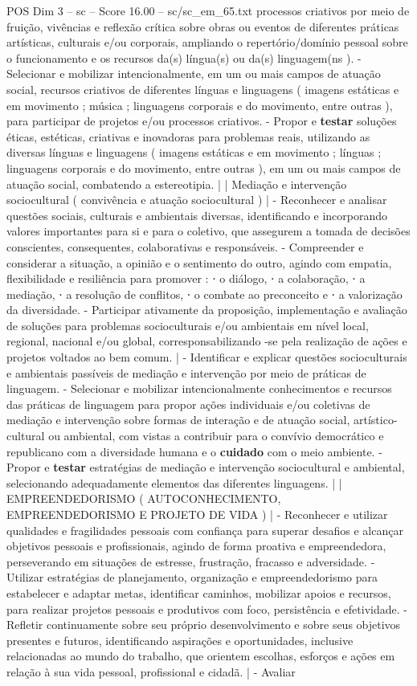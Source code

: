 \begin{textsample}{POS Dim 3 – sc – Score 16.00 – sc/sc\_em\_65.txt}
processos criativos por meio de fruição, vivências e reflexão crítica sobre obras ou eventos de diferentes práticas artísticas, culturais e/ou corporais, ampliando o repertório/domínio pessoal sobre o funcionamento e os recursos da(s) língua(s) ou da(s) linguagem(ns ). - Selecionar e mobilizar intencionalmente, em um ou mais campos de atuação social, recursos criativos de diferentes línguas e linguagens ( imagens estáticas e em movimento ; música ; linguagens corporais e do movimento, entre outras ), para participar de projetos e/ou processos criativos. - Propor e \textbf{testar} soluções éticas, estéticas, criativas e inovadoras para problemas reais, utilizando as diversas línguas e linguagens ( imagens estáticas e em movimento ; línguas ; linguagens corporais e do movimento, entre outras ), em um ou mais campos de atuação social, combatendo a estereotipia. | | Mediação e intervenção sociocultural ( convivência e atuação sociocultural ) | - Reconhecer e analisar questões sociais, culturais e ambientais diversas, identificando e incorporando valores importantes para si e para o coletivo, que assegurem a tomada de decisões conscientes, consequentes, colaborativas e responsáveis. - Compreender e considerar a situação, a opinião e o sentimento do outro, agindo com empatia, flexibilidade e resiliência para promover : ⋅ o diálogo, ⋅ a colaboração, ⋅ a mediação, ⋅ a resolução de conflitos, ⋅ o combate ao preconceito e ⋅ a valorização da diversidade. - Participar ativamente da proposição, implementação e avaliação de soluções para problemas socioculturais e/ou ambientais em nível local, regional, nacional e/ou global, corresponsabilizando -se pela realização de ações e projetos voltados ao bem comum. | - Identificar e explicar questões socioculturais e ambientais passíveis de mediação e intervenção por meio de práticas de linguagem. - Selecionar e mobilizar intencionalmente conhecimentos e recursos das práticas de linguagem para propor ações individuais e/ou coletivas de mediação e intervenção sobre formas de interação e de atuação social, artístico-cultural ou ambiental, com vistas a contribuir para o convívio democrático e republicano com a diversidade humana e o \textbf{cuidado} com o meio ambiente. - Propor e \textbf{testar} estratégias de mediação e intervenção sociocultural e ambiental, selecionando adequadamente elementos das diferentes linguagens. | | EMPREENDEDORISMO ( AUTOCONHECIMENTO, EMPREENDEDORISMO E PROJETO DE VIDA ) | - Reconhecer e utilizar qualidades e fragilidades pessoais com confiança para superar desafios e alcançar objetivos pessoais e profissionais, agindo de forma proativa e empreendedora, perseverando em situações de estresse, frustração, fracasso e adversidade. - Utilizar estratégias de planejamento, organização e empreendedorismo para estabelecer e adaptar metas, identificar caminhos, mobilizar apoios e recursos, para realizar projetos pessoais e produtivos com foco, persistência e efetividade. - Refletir continuamente sobre seu próprio desenvolvimento e sobre seus objetivos presentes e futuros, identificando aspirações e oportunidades, inclusive relacionadas ao mundo do trabalho, que orientem escolhas, esforços e ações em relação à sua vida pessoal, profissional e cidadã. | - Avaliar 
\end{textsample}
